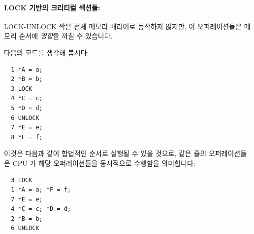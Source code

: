 \begin{enumerate}
\paragraph{LOCK 기반의 크리티컬 섹션들:}
LOCK-UNLOCK 짝은 전체 메모리 배리어로 동작하지 않지만, 이 오퍼레이션들은 메모리
순서에 \emph{영향}을 끼칠 수 있습니다.

다음의 코드를 생각해 봅시다:

\vspace{5pt}
\begin{minipage}[t]{\columnwidth}
\scriptsize
\begin{verbatim}
  1 *A = a;
  2 *B = b;
  3 LOCK
  4 *C = c;
  5 *D = d;
  6 UNLOCK
  7 *E = e;
  8 *F = f;
\end{verbatim}
\end{minipage}
\vspace{5pt}

이것은 다음과 같이 합법적인 순서로 실행될 수 있을 것으로, 같은 줄의
오퍼레이션들은 CPU 가 해당 오퍼레이션들을 동시적으로 수행함을 의미합니다:

\vspace{5pt}
\begin{minipage}[t]{\columnwidth}
\scriptsize
\begin{verbatim}
  3 LOCK
  1 *A = a; *F = f;
  7 *E = e;
  4 *C = c; *D = d;
  2 *B = b;
  6 UNLOCK
\end{verbatim}
\end{minipage}
\vspace{5pt}


\end{enumerate}
